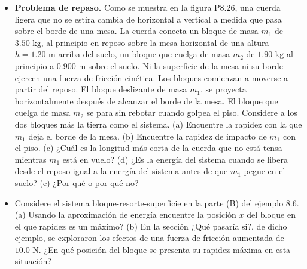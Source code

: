 \documentclass[11pt,a4paper]{article}
\begin{document}
\begin{itemize}
    \item[\textbf{26.}] \textbf{Problema de repaso.} Como se muestra en la figura P8.26, una cuerda ligera que no se estira cambia de horizontal a vertical a medida que pasa sobre el borde de una mesa. La cuerda conecta un bloque de masa $m_1$ de $3.50 \text{ kg}$, al principio en reposo sobre la mesa horizontal de una altura $h = 1.20 \text{ m}$ arriba del suelo, un bloque que cuelga de masa $m_2$ de $1.90 \text{ kg}$ al principio a $0.900 \text{ m}$ sobre el suelo. Ni la superficie de la mesa ni su borde ejercen una fuerza de fricción cinética. Los bloques comienzan a moverse a partir del reposo. El bloque deslizante de masa $m_1$, se proyecta horizontalmente después de alcanzar el borde de la mesa. El bloque que cuelga de masa $m_2$ se para sin rebotar cuando golpea el piso. Considere a los dos bloques más la tierra como el sistema. (a) Encuentre la rapidez con la que $m_1$ deja el borde de la mesa. (b) Encuentre la rapidez de impacto de $m_1$ con el piso. (c) ¿Cuál es la longitud más corta de la cuerda que no está tensa mientras $m_1$ está en vuelo? (d) ¿Es la energía del sistema cuando se libera desde el reposo igual a la energía del sistema antes de que $m_1$ pegue en el suelo? (e) ¿Por qué o por qué no?
    \vspace*{8cm}

    \item[\textbf{27.}] Considere el sistema bloque-resorte-superficie en la parte (B) del ejemplo 8.6. (a) Usando la aproximación de energía encuentre la posición $x$ del bloque en el que rapidez es un máximo? (b) En la sección ¿Qué pasaría si?, de dicho ejemplo, se exploraron los efectos de una fuerza de fricción aumentada de $10.0 \text{ N}$. ¿En qué posición del bloque se presenta su rapidez máxima en esta situación?
    \vspace*{6cm}
\end{itemize}

\newpage
\end{document}
